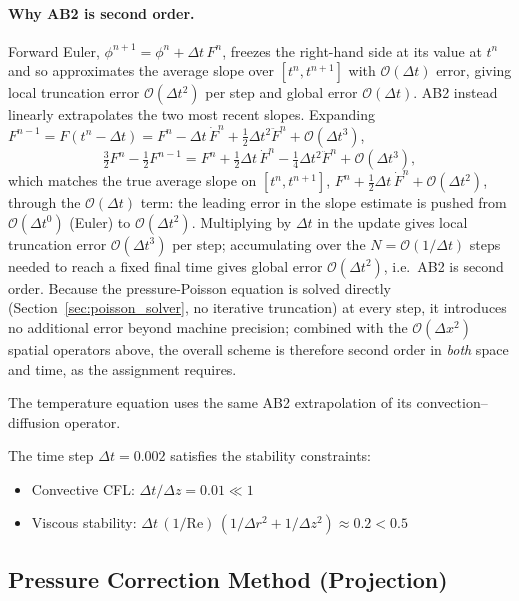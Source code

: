 \documentclass[12pt,a4paper]{article}
\newcommand{\Rey}{\text{Re}}
\begin{document}
\paragraph{Why AB2 is second order.} Forward Euler, $\phi^{n+1}=\phi^n+\Delta t\,F^n$, freezes the
right-hand side at its value at $t^n$ and so approximates the average slope over $[t^n,t^{n+1}]$
with $\mathcal{O}(\Delta t)$ error, giving local truncation error $\mathcal{O}(\Delta t^2)$ per
step and global error $\mathcal{O}(\Delta t)$. AB2 instead linearly extrapolates the two most
recent slopes. Expanding $F^{n-1}=F(t^n-\Delta t) = F^n-\Delta t\,\dot F^n+\tfrac12\Delta t^2\ddot
F^n+\mathcal{O}(\Delta t^3)$,
\begin{equation}
    \tfrac32 F^n-\tfrac12 F^{n-1}
    = F^n+\tfrac12\Delta t\,\dot F^n-\tfrac14\Delta t^2\ddot F^n+\mathcal{O}(\Delta t^3),
\end{equation}
which matches the true average slope on $[t^n,t^{n+1}]$, $F^n+\tfrac12\Delta t\,\dot F^n
+\mathcal{O}(\Delta t^2)$, through the $\mathcal{O}(\Delta t)$ term: the leading error in the
slope estimate is pushed from $\mathcal{O}(\Delta t^0)$ (Euler) to $\mathcal{O}(\Delta t^2)$.
Multiplying by $\Delta t$ in the update gives local truncation error $\mathcal{O}(\Delta t^3)$
per step; accumulating over the $N=\mathcal{O}(1/\Delta t)$ steps needed to reach a fixed final
time gives global error $\mathcal{O}(\Delta t^2)$, i.e.\ AB2 is second order. Because the
pressure-Poisson equation is solved directly (Section~\ref{sec:poisson_solver}, no
iterative truncation) at every step, it introduces no additional error beyond machine precision;
combined with the $\mathcal{O}(\Delta x^2)$ spatial operators above, the overall scheme is
therefore second order in \emph{both} space and time, as the assignment requires.

The temperature equation uses the same AB2 extrapolation of its
convection--diffusion operator.

The time step $\Delta t = 0.002$ satisfies the stability constraints:
\begin{itemize}
    \item Convective CFL: $\Delta t / \Delta z = 0.01 \ll 1$
    \item Viscous stability: $\Delta t\,(1/\Rey)\,(1/\Delta r^2 + 1/\Delta z^2) \approx 0.2 < 0.5$
\end{itemize}

\subsection{Pressure Correction Method (Projection)}
\label{sec:pressure-correction}
\end{document}
